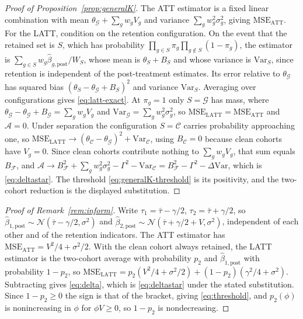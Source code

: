 \documentclass[12pt]{article}
\theoremstyle{remark}
\begin{document}
\begin{proof}[Proof of Proposition~\ref{prop:generalK}]
The ATT estimator is a fixed linear combination with mean
$\theta_{\mathcal G}+\sum_g w_gV_g$ and variance $\sum_g w_g^2\sigma_g^2$, giving
$\mathrm{MSE}_{\mathrm{ATT}}$. For the LATT, condition on the retention configuration. On the
event that the retained set is $S$, which has probability
$\prod_{g\in S}\pi_g\prod_{g\notin S}(1-\pi_g)$, the estimator is
$\sum_{g\in S}w_g\hat\beta_{g,\mathrm{post}}/W_S$, whose mean is $\theta_S+B_S$ and whose
variance is $\mathrm{Var}_S$, since retention is independent of the post-treatment estimates. Its
error relative to $\theta_{\mathcal G}$ has squared bias $(\theta_S-\theta_{\mathcal G}+B_S)^2$ and
variance $\mathrm{Var}_S$. Averaging over configurations gives \eqref{eq:latt-exact}. At
$\pi_g=1$ only $S=\mathcal G$ has mass, where $\theta_{\mathcal G}-\theta_{\mathcal G}+B_{\mathcal G}
=\sum_g w_gV_g$ and $\mathrm{Var}_{\mathcal G}=\sum_g w_g^2\sigma_g^2$, so
$\mathrm{MSE}_{\mathrm{LATT}}=\mathrm{MSE}_{\mathrm{ATT}}$ and $\mathcal{A}=0$. Under separation the
configuration $S=\mathcal C$ carries probability approaching one, so
$\mathrm{MSE}_{\mathrm{LATT}}\to(\theta_{\mathcal C}-\theta_{\mathcal G})^2+\mathrm{Var}_{\mathcal C}$,
using $B_{\mathcal C}=0$ because clean cohorts have $V_g=0$. Since clean cohorts contribute nothing
to $\sum_g w_gV_g$, that sum equals $B_{\mathcal F}$, and
$\mathcal{A}\to B_{\mathcal F}^2+\sum_g w_g^2\sigma_g^2-\Gamma^2-\mathrm{Var}_{\mathcal C}
=B_{\mathcal F}^2-\Gamma^2-\Delta\mathrm{Var}$, which is \eqref{eq:deltastar}. The threshold
\eqref{eq:generalK-threshold} is its positivity, and the two-cohort reduction is the displayed
substitution.
\end{proof}

\begin{proof}[Proof of Remark~\ref{rem:inform}]
Write $\tau_1=\bar\tau-\gamma/2$, $\tau_2=\bar\tau+\gamma/2$, so
$\hat\beta_{1,\mathrm{post}}\sim\mathcal N(\bar\tau-\gamma/2,\sigma^2)$ and
$\hat\beta_{2,\mathrm{post}}\sim\mathcal N(\bar\tau+\gamma/2+V,\sigma^2)$, independent of each other
and of the retention indicators. The ATT estimator has
$\mathrm{MSE}_{\mathrm{ATT}}=V^2/4+\sigma^2/2$. With the clean cohort always retained, the LATT
estimator is the two-cohort average with probability $p_2$ and $\hat\beta_{1,\mathrm{post}}$ with
probability $1-p_2$, so
$\mathrm{MSE}_{\mathrm{LATT}}=p_2(V^2/4+\sigma^2/2)+(1-p_2)(\gamma^2/4+\sigma^2)$. Subtracting gives
\eqref{eq:delta}, which is \eqref{eq:deltastar} under the stated substitution. Since $1-p_2\ge0$ the
sign is that of the bracket, giving \eqref{eq:threshold}, and $p_2(\phi)$ is nonincreasing in $\phi$
for $\phi V\ge0$, so $1-p_2$ is nondecreasing.
\end{proof}
\end{document}

